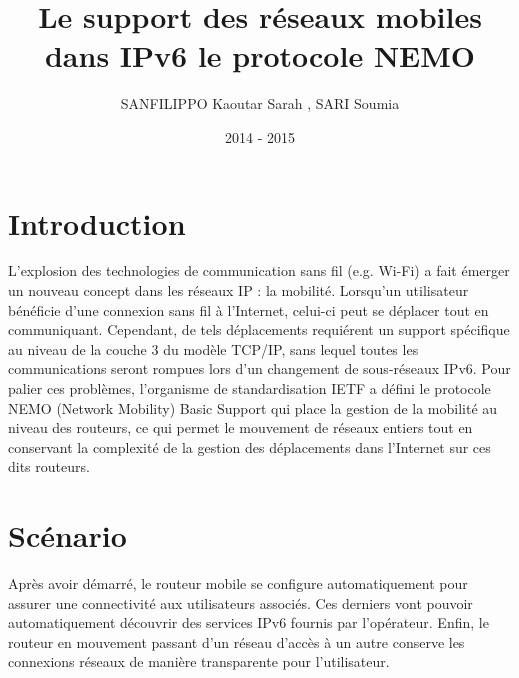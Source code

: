 \documentclass[12pt]{article}
\title{Le support des r\'{e}seaux mobiles dans IPv6
           le protocole NEMO }
\author{SANFILIPPO Kaoutar Sarah , SARI Soumia}
\date{2014 - 2015}
\begin{document}
\maketitle
\newpage
\renewcommand{\contentsname}{Sommaire}
\tableofcontents

\newpage
\section{Introduction}

L'explosion des technologies de communication sans fil (e.g. Wi-Fi) a fait \'{e}merger un nouveau
concept dans les r\'{e}seaux IP : la mobilit\'{e}. Lorsqu'un utilisateur b\'{e}n\'{e}ficie d'une connexion sans fil \`a
l'Internet, celui-ci peut se d\'{e}placer tout en communiquant. Cependant, de tels d\'{e}placements
requi\'{e}rent un support sp\'{e}cifique au niveau de la couche 3 du mod\`{e}le TCP/IP, sans lequel toutes les
communications seront rompues lors d'un changement de sous-r\'{e}seaux IPv6. Pour palier ces
probl\`{e}mes, l'organisme de standardisation IETF a d\'{e}fini le protocole NEMO (Network Mobility) Basic
Support qui place la gestion de la mobilit\'{e} au niveau des routeurs, ce qui permet le mouvement de
r\'{e}seaux entiers tout en conservant la complexit\'{e} de la gestion des d\'{e}placements dans l'Internet sur
ces dits routeurs.

\newpage
\section{Sc\'{e}nario}

Apr\`{e}s avoir d\'{e}marr\'{e}, le routeur mobile se configure automatiquement pour assurer une connectivit\'{e} aux utilisateurs associ\'{e}s. Ces derniers vont pouvoir automatiquement d\'{e}couvrir des services IPv6 fournis par l'op\'{e}rateur. Enfin, le routeur en mouvement passant d'un r\'{e}seau d'acc\`{e}s à un autre conserve les connexions r\'{e}seaux de mani\`{e}re transparente pour l'utilisateur.
\end{document}
